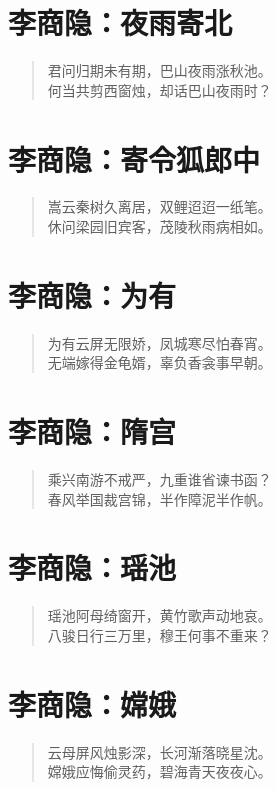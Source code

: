 \documentclass[12pt,oneside]{book}
\newenvironment{shici}{%
\begin{verse}\centering\yanti\large\hspace{12pt}}{\end{verse}}
\begin{document}
\begin{common-format}
\chapter{李商隐：夜雨寄北}
\begin{shici}
君问归期未有期，巴山夜雨涨秋池。\\
何当共剪西窗烛，却话巴山夜雨时？
\end{shici}

\chapter{李商隐：寄令狐郎中}
\begin{shici}
嵩云秦树久离居，双鲤迢迢一纸笔。\\
休问梁园旧宾客，茂陵秋雨病相如。
\end{shici}

\chapter{李商隐：为有}
\begin{shici}
为有云屏无限娇，凤城寒尽怕春宵。\\
无端嫁得金龟婿，辜负香衾事早朝。
\end{shici}

\chapter{李商隐：隋宫}
\begin{shici}
乘兴南游不戒严，九重谁省谏书函？\\
春风举国裁宫锦，半作障泥半作帆。
\end{shici}

\chapter{李商隐：瑶池}
\begin{shici}
瑶池阿母绮窗开，黄竹歌声动地哀。\\
八骏日行三万里，穆王何事不重来？
\end{shici}

\chapter{李商隐：嫦娥}
\begin{shici}
云母屏风烛影深，长河渐落晓星沈。\\
嫦娥应悔偷灵药，碧海青天夜夜心。
\end{shici}


\end{common-format}
\end{document}
